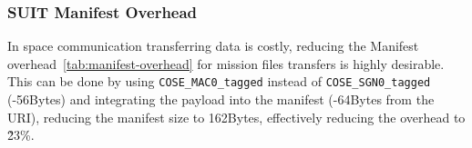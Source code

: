\subsubsection{SUIT Manifest Overhead}

In space communication transferring data is costly, reducing the Manifest
overhead~\ref{tab:manifest-overhead} for mission files transfers is highly
desirable. This can be done by using \texttt{COSE\_MAC0\_tagged} instead of
\texttt{COSE\_SGN0\_tagged} (-56Bytes) and integrating the payload into the
manifest (-64Bytes from the URI), reducing the manifest size to 162Bytes,
effectively reducing the overhead to \~23\%.

